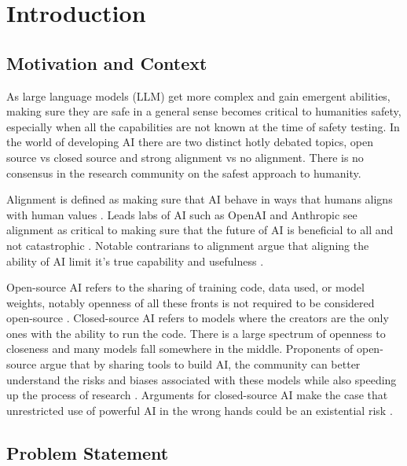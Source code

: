 \section{Introduction}

\subsection{Motivation and Context}

As large language models (LLM) get more complex and gain emergent abilities, making sure they are safe in a general sense becomes critical to humanities safety, especially when all the capabilities are not known at the time of safety testing. In the world of developing AI there are two distinct hotly debated topics, open source vs closed source and strong alignment vs no alignment. There is no consensus in the research community on the safest approach to humanity.

Alignment is defined as making sure that AI behave in ways that humans aligns with human values \citep{ji_ai_2023}. Leads labs of AI such as OpenAI and Anthropic see alignment as critical to making sure that the future of AI is beneficial to all and not catastrophic \citep{openai_alignment, anthropic_core_views}. Notable contrarians to alignment argue that aligning the ability of AI limit it's true capability and usefulness \citep{franzen_2024_interview}.

Open-source AI refers to the sharing of training code, data used, or model weights, notably openness of all these fronts is not required to be considered open-source \citep{eiras_near_2024}. Closed-source AI refers to models where the creators are the only ones with the ability to run the code. There is a large spectrum of openness to closeness and many models fall somewhere in the middle. Proponents of open-source argue that by sharing tools to build AI, the community can better understand the risks and biases associated with these models while also speeding up the process of research \citep{groeneveld_olmo_2024}. Arguments for closed-source AI make the case that unrestricted use of powerful AI in the wrong hands could be an existential risk \citep{deepmind_frontier_2025}.

\subsection{Problem Statement}

